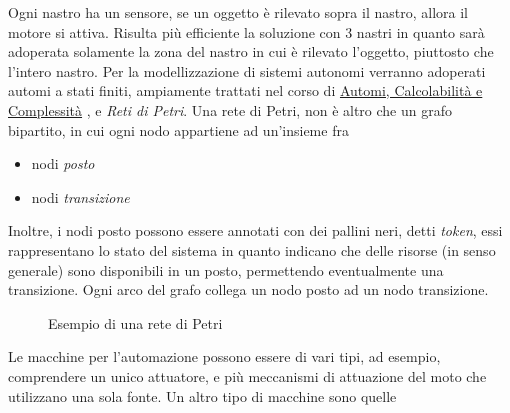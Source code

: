 \documentclass[10pt, letterpaper]{report}
\begin{document}
Ogni nastro ha un sensore, se un oggetto è rilevato sopra il nastro, allora il motore si attiva. Risulta più efficiente 
la soluzione con 3 nastri in quanto sarà adoperata solamente la zona del nastro in cui è rilevato l'oggetto, piuttosto 
che l'intero nastro.\acc 
Per la modellizzazione di sistemi autonomi verranno adoperati automi a stati finiti, ampiamente trattati nel 
corso di 
\color{blue}\href{https://github.com/CasuFrost/University_notes/blob/main/Terzo%20Anno/Automi%2C%20Calcolabilit%C3%A0%20e%20Complessit%C3%A0/Automi%2C%20Calcolabilit%C3%A0%20e%20Complessit%C3%A0.pdf}{Automi, Calcolabilità e Complessità}
\color{black}, e \textit{Reti di Petri}. Una rete di Petri, non è altro che un grafo bipartito, in cui ogni nodo 
appartiene ad un'insieme fra \begin{itemize}
    \item nodi \textit{posto}
    \item nodi \textit{transizione}
\end{itemize}
Inoltre, i nodi posto possono essere annotati con dei pallini neri, detti \textit{token}, essi rappresentano 
lo stato del sistema in quanto indicano che delle risorse (in senso generale) sono disponibili in un posto, 
permettendo eventualmente una transizione. Ogni arco del grafo collega un nodo posto ad un nodo transizione.
\begin{figure}[h!]
    \centering
      \caption{Esempio di una rete di Petri}
\end{figure}\acc
Le macchine per l'automazione possono essere di vari tipi, ad esempio, comprendere un unico attuatore, e più 
meccanismi di attuazione del moto che utilizzano una sola fonte. Un altro tipo di macchine sono quelle 
\end{document}
